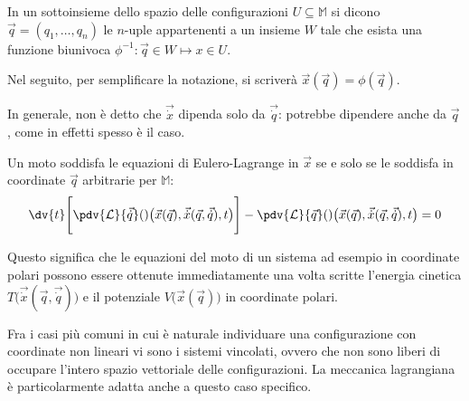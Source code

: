 \begin{definition} \label{def:coordinates}
  In un sottoinsieme dello spazio delle configurazioni $U \subseteq \mathbb{M}$ si dicono  $\vec{q}=(q_1, \ldots, q_n)$ le $n$-uple appartenenti a un insieme $W$ tale che esista una funzione biunivoca $\phi^{-1}: \vec{q} \in W \mapsto x\in U$. 
\end{definition}
\begin{remark}
  Nel seguito, per semplificare la notazione, si scriverà $\vec{x}(\vec{q}) = \phi(\vec{q})$.
\end{remark}
\begin{remark}
  In generale, non è detto che $\vec{\dot{x}}$ dipenda solo da $\vec{\dot{q}}$: potrebbe dipendere anche da $\vec{q}$, come in effetti spesso è il caso.
\end{remark}
\begin{theorem}
  Un moto soddisfa le equazioni di Eulero-Lagrange in $\vec{x}$ se e solo se le soddisfa in coordinate $\vec{q}$ arbitrarie per $\mathbb{M}$: \begin{equation*}
    \dv{t}\Bigg[\pdv{\mathcal{L}}{\vec{\dot{q}}}()\big(\vec{x}(\vec{q}), \vec{\dot{x}}(\vec{q},\vec{\dot{q}}), t\big)\Bigg] - \pdv{\mathcal{L}}{\vec{q}}()\big(\vec{x}(\vec{q}), \vec{\dot{x}}(\vec{q},\vec{\dot{q}}), t\big) = 0
  \end{equation*} 
\end{theorem}

Questo significa che le equazioni del moto di un sistema ad esempio in coordinate polari possono essere ottenute immediatamente una volta scritte l'energia cinetica $T\big(\vec{\dot{x}}(\vec{q},\vec{\dot{q}})\big)$ e il potenziale $V\big(\vec{x}(\vec{q})\big)$ in coordinate polari.

Fra i casi più comuni in cui è naturale individuare una configurazione con coordinate non lineari vi sono i sistemi vincolati, ovvero che non sono liberi di occupare l'intero spazio vettoriale delle configurazioni. La meccanica lagrangiana è particolarmente adatta anche a questo caso specifico.


